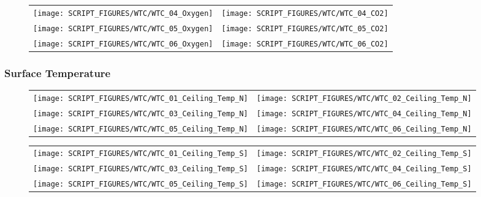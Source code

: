 \begin{figure}[!ht]
\begin{tabular*}{\textwidth}{l@{\extracolsep{\fill}}r}
\texttt{[image: SCRIPT\_FIGURES/WTC/WTC\_04\_Oxygen]} &
\texttt{[image: SCRIPT\_FIGURES/WTC/WTC\_04\_CO2]} \\
\texttt{[image: SCRIPT\_FIGURES/WTC/WTC\_05\_Oxygen]} &
\texttt{[image: SCRIPT\_FIGURES/WTC/WTC\_05\_CO2]} \\
\texttt{[image: SCRIPT\_FIGURES/WTC/WTC\_06\_Oxygen]} &
\texttt{[image: SCRIPT\_FIGURES/WTC/WTC\_06\_CO2]}
\end{tabular*}
\label{NIST_WTC_Oxygen_CO2_2}
\end{figure}

\clearpage

\subsubsection{Surface Temperature}

\begin{figure}[!ht]
\begin{tabular*}{\textwidth}{l@{\extracolsep{\fill}}r}
\texttt{[image: SCRIPT\_FIGURES/WTC/WTC\_01\_Ceiling\_Temp\_N]} &
\texttt{[image: SCRIPT\_FIGURES/WTC/WTC\_02\_Ceiling\_Temp\_N]} \\
\texttt{[image: SCRIPT\_FIGURES/WTC/WTC\_03\_Ceiling\_Temp\_N]} &
\texttt{[image: SCRIPT\_FIGURES/WTC/WTC\_04\_Ceiling\_Temp\_N]} \\
\texttt{[image: SCRIPT\_FIGURES/WTC/WTC\_05\_Ceiling\_Temp\_N]} &
\texttt{[image: SCRIPT\_FIGURES/WTC/WTC\_06\_Ceiling\_Temp\_N]}
\end{tabular*}
\label{NIST_WTC_Ceiling_N}
\end{figure}

\begin{figure}[!ht]
\begin{tabular*}{\textwidth}{l@{\extracolsep{\fill}}r}
\texttt{[image: SCRIPT\_FIGURES/WTC/WTC\_01\_Ceiling\_Temp\_S]} &
\texttt{[image: SCRIPT\_FIGURES/WTC/WTC\_02\_Ceiling\_Temp\_S]} \\
\texttt{[image: SCRIPT\_FIGURES/WTC/WTC\_03\_Ceiling\_Temp\_S]} &
\texttt{[image: SCRIPT\_FIGURES/WTC/WTC\_04\_Ceiling\_Temp\_S]} \\
\texttt{[image: SCRIPT\_FIGURES/WTC/WTC\_05\_Ceiling\_Temp\_S]} &
\texttt{[image: SCRIPT\_FIGURES/WTC/WTC\_06\_Ceiling\_Temp\_S]}
\end{tabular*}
\label{NIST_WTC_Ceiling_S}
\end{figure}

